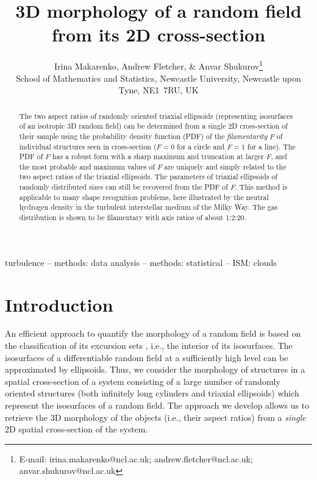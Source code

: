 \documentclass[useAMS,usenatbib]{mn2e}
\title{3D morphology of a random field from its 2D cross-section}
\author[I.~Makarenko, A.~Fletcher, \& A.~Shukurov]{Irina Makarenko,
Andrew Fletcher, \& Anvar Shukurov\thanks{E-mail: irina.makarenko@ncl.ac.uk;
andrew.fletcher@ncl.ac.uk; anvar.shukurov@ncl.ac.uk}\\
School of Mathematics and Statistics, Newcastle University,
Newcastle upon Tyne, NE1~7RU, UK}
\begin{document}
\pagerange{\pageref{firstpage}--\pageref{lastpage}} 

\maketitle

\label{firstpage}

\begin{abstract}
The two aspect ratios of randomly oriented triaxial ellipsoids (representing
isosurfaces of an isotropic 3D random field) can be determined from a single
2D cross-section of their sample using the probability density function (PDF)
of the \textit{filamentarity\/} $F$ of individual structures seen in
cross-section ($F=0$ for a circle and $F=1$ for a line). The PDF of $F$ has a
robust form with a sharp maximum and truncation at larger $F$, and the most
probable and maximum values of $F$ are uniquely and simply related to the two
aspect ratios of the triaxial ellipsoids. The parameters of triaxial
ellipsoids of randomly distributed sizes can still be recovered from the PDF
of $F$. This method is applicable to many shape recognition problems, here
illustrated by the neutral hydrogen density in the turbulent interstellar
medium of the Milky Way. The gas distribution is shown to be filamentary with
axis ratios of about 1:2:20.
\end{abstract}
\begin{keywords}
turbulence -- methods: data analysis -- methods: statistical -- ISM: clouds
\end{keywords}
\maketitle


\section{Introduction}An efficient approach to quantify the morphology of a
random field is based on the classification of its excursion sets
\citep{AT07}, i.e., the interior of its isosurfaces. The isosurfaces of a
differentiable random field at a sufficiently high level can be approximated
by ellipsoids. Thus, we consider the morphology of structures in a spatial
cross-section of a system consisting of a large number of randomly oriented
structures (both infinitely long cylinders and triaxial ellipsoids) which
represent the isosurfaces of a random field. The approach we develop allows us
to retrieve the 3D morphology of the objects (i.e., their aspect ratios) from
a \textit{single\/} 2D spatial cross-section of the system.
\end{document}
